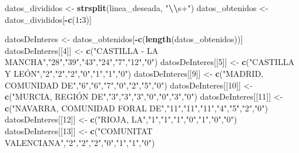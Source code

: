 \documentclass[
]{article}
\newenvironment{Shaded}{\begin{snugshade}}{\end{snugshade}}
\newcommand{\DecValTok}[1]{\textcolor[rgb]{0.00,0.00,0.81}{#1}}
\newcommand{\FunctionTok}[1]{\textcolor[rgb]{0.13,0.29,0.53}{\textbf{#1}}}
\newcommand{\NormalTok}[1]{#1}
\newcommand{\OtherTok}[1]{\textcolor[rgb]{0.56,0.35,0.01}{#1}}
\newcommand{\SpecialCharTok}[1]{\textcolor[rgb]{0.81,0.36,0.00}{\textbf{#1}}}
\newcommand{\StringTok}[1]{\textcolor[rgb]{0.31,0.60,0.02}{#1}}
\begin{document}
\begin{Shaded}
\begin{Highlighting}[]
\NormalTok{datos\_divididos }\OtherTok{\textless{}{-}} \FunctionTok{strsplit}\NormalTok{(linea\_deseada, }\StringTok{"}\SpecialCharTok{\textbackslash{}\textbackslash{}}\StringTok{s+"}\NormalTok{)}
\NormalTok{datos\_obtenidos }\OtherTok{\textless{}{-}}\NormalTok{ datos\_divididos[}\SpecialCharTok{{-}}\FunctionTok{c}\NormalTok{(}\DecValTok{1}\SpecialCharTok{:}\DecValTok{3}\NormalTok{)]}

\NormalTok{datosDeInteres }\OtherTok{\textless{}{-}}\NormalTok{ datos\_obtenidos[}\SpecialCharTok{{-}}\FunctionTok{c}\NormalTok{(}\FunctionTok{length}\NormalTok{(datos\_obtenidos))]}
\NormalTok{datosDeInteres[[}\DecValTok{4}\NormalTok{]] }\OtherTok{\textless{}{-}} \FunctionTok{c}\NormalTok{(}\StringTok{"CASTILLA {-} LA MANCHA"}\NormalTok{,}\StringTok{"28"}\NormalTok{,}\StringTok{"39"}\NormalTok{,}\StringTok{"43"}\NormalTok{,}\StringTok{"24"}\NormalTok{,}\StringTok{"7"}\NormalTok{,}\StringTok{"12"}\NormalTok{,}\StringTok{"0"}\NormalTok{)}
\NormalTok{datosDeInteres[[}\DecValTok{5}\NormalTok{]] }\OtherTok{\textless{}{-}} \FunctionTok{c}\NormalTok{(}\StringTok{"CASTILLA Y LEÓN"}\NormalTok{,}\StringTok{"2"}\NormalTok{,}\StringTok{"2"}\NormalTok{,}\StringTok{"2"}\NormalTok{,}\StringTok{"0"}\NormalTok{,}\StringTok{"1"}\NormalTok{,}\StringTok{"1"}\NormalTok{,}\StringTok{"0"}\NormalTok{)}
\NormalTok{datosDeInteres[[}\DecValTok{9}\NormalTok{]] }\OtherTok{\textless{}{-}} \FunctionTok{c}\NormalTok{(}\StringTok{"MADRID, COMUNIDAD DE"}\NormalTok{,}\StringTok{"6"}\NormalTok{,}\StringTok{"6"}\NormalTok{,}\StringTok{"7"}\NormalTok{,}\StringTok{"0"}\NormalTok{,}\StringTok{"2"}\NormalTok{,}\StringTok{"5"}\NormalTok{,}\StringTok{"0"}\NormalTok{)}
\NormalTok{datosDeInteres[[}\DecValTok{10}\NormalTok{]] }\OtherTok{\textless{}{-}} \FunctionTok{c}\NormalTok{(}\StringTok{"MURCIA, REGIÓN DE"}\NormalTok{,}\StringTok{"3"}\NormalTok{,}\StringTok{"3"}\NormalTok{,}\StringTok{"3"}\NormalTok{,}\StringTok{"0"}\NormalTok{,}\StringTok{"0"}\NormalTok{,}\StringTok{"3"}\NormalTok{,}\StringTok{"0"}\NormalTok{)}
\NormalTok{datosDeInteres[[}\DecValTok{11}\NormalTok{]] }\OtherTok{\textless{}{-}} \FunctionTok{c}\NormalTok{(}\StringTok{"NAVARRA, COMUNIDAD FORAL DE"}\NormalTok{,}\StringTok{"11"}\NormalTok{,}\StringTok{"11"}\NormalTok{,}\StringTok{"11"}\NormalTok{,}\StringTok{"4"}\NormalTok{,}\StringTok{"5"}\NormalTok{,}\StringTok{"2"}\NormalTok{,}\StringTok{"0"}\NormalTok{)}
\NormalTok{datosDeInteres[[}\DecValTok{12}\NormalTok{]] }\OtherTok{\textless{}{-}} \FunctionTok{c}\NormalTok{(}\StringTok{"RIOJA, LA"}\NormalTok{,}\StringTok{"1"}\NormalTok{,}\StringTok{"1"}\NormalTok{,}\StringTok{"1"}\NormalTok{,}\StringTok{"0"}\NormalTok{,}\StringTok{"1"}\NormalTok{,}\StringTok{"0"}\NormalTok{,}\StringTok{"0"}\NormalTok{)}
\NormalTok{datosDeInteres[[}\DecValTok{13}\NormalTok{]] }\OtherTok{\textless{}{-}} \FunctionTok{c}\NormalTok{(}\StringTok{"COMUNITAT VALENCIANA"}\NormalTok{,}\StringTok{"2"}\NormalTok{,}\StringTok{"2"}\NormalTok{,}\StringTok{"2"}\NormalTok{,}\StringTok{"0"}\NormalTok{,}\StringTok{"1"}\NormalTok{,}\StringTok{"1"}\NormalTok{,}\StringTok{"0"}\NormalTok{)}
\end{Highlighting}
\end{Shaded}
\end{document}
